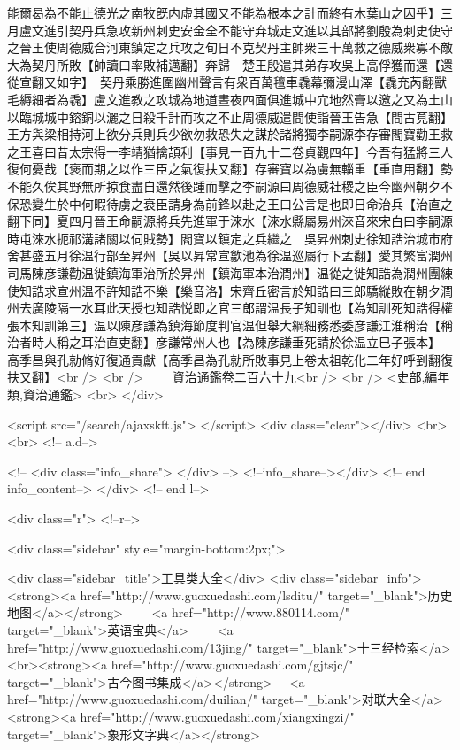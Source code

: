 能爾曷為不能止德光之南牧旣内虛其國又不能為根本之計而終有木葉山之囚乎】三月盧文進引契丹兵急攻新州刺史安金全不能守弃城走文進以其部將劉殷為刺史使守之晉王使周德威合河東鎮定之兵攻之旬日不克契丹主帥衆三十萬救之德威衆寡不敵大為契丹所敗【帥讀曰率敗補邁翻】奔歸　楚王殷遣其弟存攻吳上高俘獲而還【還從宣翻又如字】　契丹乘勝進圍幽州聲言有衆百萬氊車毳幕彌漫山澤【毳充芮翻獸毛縟細者為毳】盧文進教之攻城為地道晝夜四面俱進城中宂地然膏以邀之又為土山以臨城城中鎔銅以灑之日殺千計而攻之不止周德威遣間使詣晉王告急【間古莧翻】王方與梁相持河上欲分兵則兵少欲勿救恐失之謀於諸將獨李嗣源李存審閻寶勸王救之王喜曰昔太宗得一李靖猶擒頡利【事見一百九十二卷貞觀四年】今吾有猛將三人復何憂哉【褒而期之以作三臣之氣復扶又翻】存審寶以為虜無輜重【重直用翻】勢不能久俟其野無所掠食盡自還然後踵而擊之李嗣源曰周德威社稷之臣今幽州朝夕不保恐變生於中何暇待虜之衰臣請身為前鋒以赴之王曰公言是也即日命治兵【治直之翻下同】夏四月晉王命嗣源將兵先進軍于淶水【淶水縣屬易州淶音來宋白曰李嗣源時屯淶水扼祁溝諸關以伺賊勢】閻寶以鎮定之兵繼之　吳昇州刺史徐知誥治城市府舍甚盛五月徐温行部至昇州【吳以昇常宣歙池為徐温巡屬行下孟翻】愛其繁富潤州司馬陳彦謙勸温徙鎮海軍治所於昇州【鎮海軍本治潤州】温從之徙知誥為潤州團練使知誥求宣州温不許知誥不樂【樂音洛】宋齊丘密言於知誥曰三郎驕縱敗在朝夕潤州去廣陵隔一水耳此天授也知誥悦即之官三郎謂温長子知訓也【為知訓死知誥得權張本知訓第三】温以陳彦謙為鎮海節度判官温但舉大綱細務悉委彦謙江淮稱治【稱治者時人稱之耳治直吏翻】彦謙常州人也【為陳彦謙垂死請於徐温立巳子張本】　高季昌與孔勍脩好復通貢獻【高季昌為孔勍所敗事見上卷太祖乾化二年好呼到翻復扶又翻】<br />
<br />
　　資治通鑑卷二百六十九<br />
<br />
<史部,編年類,資治通鑑>  <br>
   </div> 

<script src="/search/ajaxskft.js"> </script>
 <div class="clear"></div>
<br>
<br>
 <!-- a.d-->

 <!--
<div class="info_share">
</div> 
-->
 <!--info_share--></div>   <!-- end info_content-->
  </div> <!-- end l-->

<div class="r">   <!--r-->



<div class="sidebar"  style="margin-bottom:2px;">

 
<div class="sidebar_title">工具类大全</div>
<div class="sidebar_info">
<strong><a href="http://www.guoxuedashi.com/lsditu/" target="_blank">历史地图</a></strong>　　
<a href="http://www.880114.com/" target="_blank">英语宝典</a>　　
<a href="http://www.guoxuedashi.com/13jing/" target="_blank">十三经检索</a>　
<br><strong><a href="http://www.guoxuedashi.com/gjtsjc/" target="_blank">古今图书集成</a></strong>　
<a href="http://www.guoxuedashi.com/duilian/" target="_blank">对联大全</a>　<strong><a href="http://www.guoxuedashi.com/xiangxingzi/" target="_blank">象形文字典</a></strong>　

